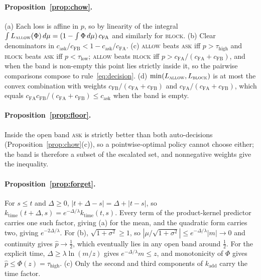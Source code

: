 \documentclass[11pt]{article}
\begin{document}
\paragraph{Proposition~\ref{prop:chow}.} (a) Each loss is affine in $p$, so by
linearity of the integral $\int L_{\textsc{allow}}(\Phi)\,d\mu =
(1 - \int\Phi\,d\mu)\,c_{\text{FA}}$ and similarly for \textsc{block}.
(b) Clear denominators in $c_{\text{ask}}/c_{\text{FB}} < 1 - c_{\text{ask}}/c_{\text{FA}}$.
(c) \textsc{allow} beats \textsc{ask} iff $p > \tau_{\text{high}}$ and
\textsc{block} beats \textsc{ask} iff $p < \tau_{\text{low}}$; \textsc{allow}
beats \textsc{block} iff $p > c_{\text{FA}}/(c_{\text{FA}} + c_{\text{FB}})$,
and when the band is non-empty this point lies strictly inside it, so the
pairwise comparisons compose to rule~\eqref{eq:decision}. (d)
$\min(L_{\textsc{allow}}, L_{\textsc{block}})$ is at most the convex
combination with weights $c_{\text{FB}}/(c_{\text{FA}}+c_{\text{FB}})$ and
$c_{\text{FA}}/(c_{\text{FA}}+c_{\text{FB}})$, which equals
$c_{\text{FA}}c_{\text{FB}}/(c_{\text{FA}}+c_{\text{FB}}) \le c_{\text{ask}}$
when the band is empty.

\paragraph{Proposition~\ref{prop:floor}.} Inside the open band \textsc{ask} is
strictly better than both auto-decisions (Proposition~\ref{prop:chow}(c)), so
a pointwise-optimal policy cannot choose either; the band is therefore a
subset of the escalated set, and nonnegative weights give the inequality.

\paragraph{Proposition~\ref{prop:forget}.} For $s \le t$ and $\Delta \ge 0$,
$|t + \Delta - s| = \Delta + |t - s|$, so $k_{\text{time}}(t+\Delta, s) =
e^{-\Delta/\lambda} k_{\text{time}}(t,s)$. Every term of the product-kernel
predictor carries one such factor, giving (a) for the mean, and the quadratic
form carries two, giving $e^{-2\Delta/\lambda}$. For (b), $\sqrt{1+\sigma^2}
\ge 1$, so $|\mu/\sqrt{1+\sigma^2}| \le e^{-\Delta/\lambda}|m| \to 0$ and
continuity gives $\hat p \to \tfrac12$, which eventually lies in any open band
around $\tfrac12$. For the explicit time, $\Delta \ge \lambda\ln(m/z)$ gives
$e^{-\Delta/\lambda} m \le z$, and monotonicity of $\Phi$ gives
$\hat p \le \Phi(z) = \tau_{\text{high}}$. (c) Only the second and third
components of $k_{\text{add}}$ carry the time factor.
\end{document}
